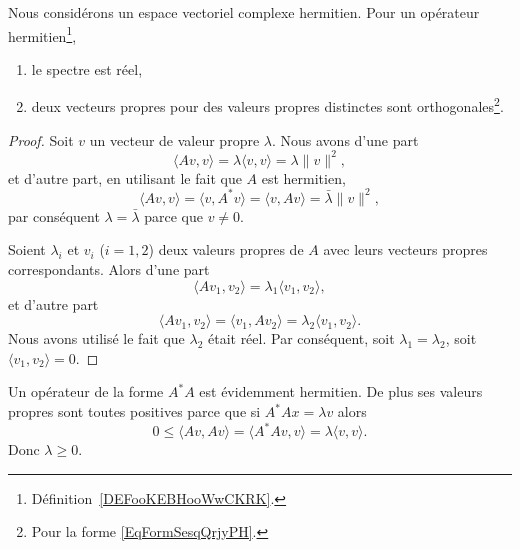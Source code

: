 \begin{lemma}      \label{LEMooVCEOooIXnTpp}
    Nous considérons un espace vectoriel complexe hermitien.  Pour un opérateur hermitien\footnote{Définition~\ref{DEFooKEBHooWwCKRK}.},
    \begin{enumerate}
        \item
            le spectre est réel,
        \item
            deux vecteurs propres pour des valeurs propres distinctes sont orthogonales\footnote{Pour la forme \eqref{EqFormSesqQrjyPH}.}.
    \end{enumerate}
\end{lemma}

\begin{proof}
    Soit \( v\) un vecteur de valeur propre \( \lambda\). Nous avons d'une part
    \begin{equation}
        \langle Av, v\rangle =\lambda\langle v, v\rangle =\lambda\| v \|^2,
    \end{equation}
    et d'autre part, en utilisant le fait que \( A\) est hermitien,
    \begin{equation}
        \langle Av, v\rangle =\langle v, A^*v\rangle =\langle v, Av\rangle =\bar\lambda\| v \|^2,
    \end{equation}
    par conséquent \( \lambda=\bar\lambda\) parce que \( v\neq 0\).

    Soient \( \lambda_i\) et \( v_i\) (\( i=1,2\)) deux valeurs propres de \( A\) avec leurs vecteurs propres correspondants. Alors d'une part
    \begin{equation}
        \langle Av_1, v_2\rangle =\lambda_1\langle v_1, v_2\rangle ,
    \end{equation}
    et d'autre part
    \begin{equation}
        \langle Av_1, v_2\rangle =\langle v_1, Av_2\rangle =\lambda_2\langle v_1, v_2\rangle .
    \end{equation}
    Nous avons utilisé le fait que \( \lambda_2\) était réel. Par conséquent, soit \( \lambda_1=\lambda_2\), soit \( \langle v_1, v_2\rangle =0\).
\end{proof}

\begin{remark}      \label{REMooMLBCooTuKFmz}
    Un opérateur de la forme \( A^*A\) est évidemment hermitien. De plus ses valeurs propres sont toutes positives parce que si \( A^*Ax=\lambda v\) alors
    \begin{equation}
        0\leq \langle Av, Av\rangle =\langle A^*Av, v\rangle =\lambda\langle v, v\rangle .
    \end{equation}
    Donc \( \lambda\geq 0\).
\end{remark}

